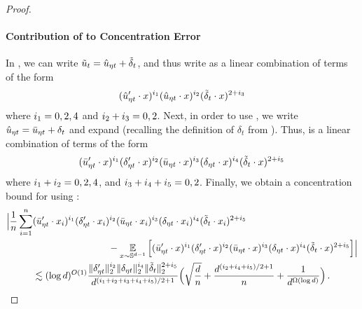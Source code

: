 \begin{proof}
\paragraph{Contribution of  to Concentration Error} In , we can write $\tilde{u}_t = \hat{u}_{\eta t} + {\tilde{\delta}}_t$, and thus write  as a linear combination of terms of the form
\begin{align}
(\hat{u}_{\eta t}' \cdot x)^{i_{1}} (\hat{u}_{\eta t} \cdot x)^{i_{2}} ({\tilde{\delta}}_t \cdot x)^{2 + i_{3}}
\end{align}
where $i_{1} = 0, 2, 4$ and $i_{2} + i_{3} = 0, 2$. Next, in order to use , we write $\hat{u}_{\eta t} = \bar{u}_{\eta t} + \delta_t$ and expand (recalling the definition of $\delta_t$ from ). Thus,  is a linear combination of terms of the form
\begin{align} \label{eq:single_term_type2_simplified}
(\bar{u}_{\eta t}' \cdot x)^{i_{1}} (\delta_{\eta t}' \cdot x)^{i_{2}}
(\bar{u}_{\eta t} \cdot x)^{i_{3}}
(\delta_{\eta t} \cdot x)^{i_{4}}
({\tilde{\delta}}_t \cdot x)^{2 + i_{5}}
\end{align}
where $i_{1} + i_{2} = 0, 2, 4$, and $i_{3} + i_{4} + i_{5} = 0, 2$. Finally, we obtain a concentration bound for  using :
\begin{align} \label{eq:type2_concentration_error}
\Big|\frac{1}{n} \sum_{i = 1}^n &(\bar{u}_{\eta t}' \cdot x_i)^{i_{1}} (\delta_{\eta t}' \cdot x_i)^{i_{2}}
(\bar{u}_{\eta t} \cdot x_i)^{i_{3}}
(\delta_{\eta t} \cdot x_i)^{i_{4}}
({\tilde{\delta}}_t \cdot x_i)^{2 + i_{5}} \\
& \,\,\,\,\,\,\,\,\,\,\,\,\,\,\,\,\,\,\,\,\,\,\,\,\,\,\,\,\,\,\,\,\,\,\,\,\,\,\,\,\,\,\,\,\,\,\,\, - \operatorname*{\mathbb{E}}_{x \sim \mathbb{S}^{d - 1}} \Big[(\bar{u}_{\eta t}' \cdot x)^{i_{1}} (\delta_{\eta t}' \cdot x)^{i_{2}}
(\bar{u}_{\eta t} \cdot x)^{i_{3}}
(\delta_{\eta t} \cdot x)^{i_{4}}
({\tilde{\delta}}_t \cdot x)^{2 + i_{5}}\Big] \Big| \\
& \lesssim (\log d)^{O(1)} \frac{\|\delta_{\eta t}'\|_2^{i_{2}} \|\delta_{\eta t}\|_2^{i_{4}} \|{\tilde{\delta}}_t\|_2^{2 + i_{5}}}{d^{(i_{1} + i_{2} + i_{3} + i_{4} + i_{5})/2 + 1}} \Big(\sqrt{\frac{d}{n}} + \frac{d^{(i_{2} + i_{4} + i_{5})/2 + 1}}{n} + \frac{1}{d^{\Omega(\log d)}} \Big) \,.
\end{align}

\end{proof}
